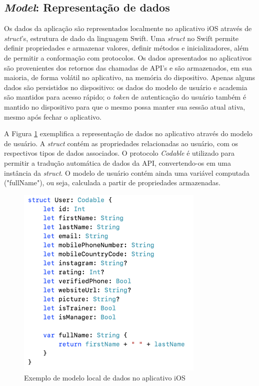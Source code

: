 \subsection{\textit{Model}: Representação de dados}
Os dados da aplicação são representados localmente no aplicativo iOS através de \textit{struct}'s, estrutura de dado da linguagem Swift. Uma \textit{struct} no Swift permite definir propriedades e armazenar valores, definir métodos e inicializadores, além de permitir a conformação com protocolos. Os dados apresentados no aplicativos são provenientes dos retornos das chamadas de API's e são armazenados, em sua maioria, de forma volátil no aplicativo, na memória do dispositivo. Apenas alguns dados são persistidos no dispositivo: os dados do modelo de usuário e academia são mantidos para acesso rápido; o \textit{token} de autenticação do usuário também é mantido no dispositivo para que o mesmo possa manter sua sessão atual ativa, mesmo após fechar o aplicativo.


A Figura \ref{fig:user-model} exemplifica a representação de dados no aplicativo através do modelo de usuário. A \textit{struct} contém as propriedades relacionadas ao usuário, com os respectivos tipos de dados associados. O protocolo \textit{Codable} é utilizado para permitir a tradução automática de dados da API, convertendo-os em uma instância da \textit{struct}. O modelo de usuário contém ainda uma variável computada ("fullName"), ou seja, calculada a partir de propriedades armazenadas.

\begin{figure}[H]
    \centering
    \includegraphics[width=0.8\textwidth]{pfc/figuras/user-model.png}
    \caption{Exemplo de modelo local de dados no aplicativo iOS}
    \label{fig:user-model}
\end{figure}

